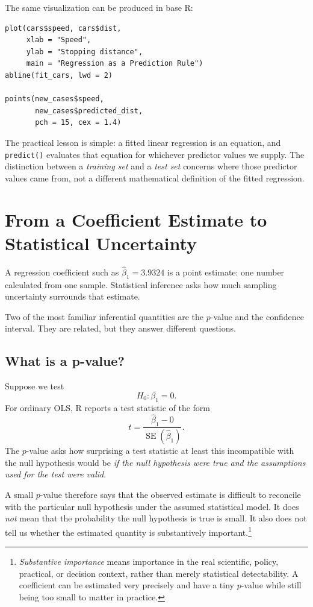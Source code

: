 \documentclass[11pt]{report}
\begin{document}
The same visualization can be produced in base R:

\begin{lstlisting}
plot(cars$speed, cars$dist,
     xlab = "Speed",
     ylab = "Stopping distance",
     main = "Regression as a Prediction Rule")
abline(fit_cars, lwd = 2)

points(new_cases$speed,
       new_cases$predicted_dist,
       pch = 15, cex = 1.4)
\end{lstlisting}

The practical lesson is simple: a fitted linear regression is an equation, and \texttt{predict()} evaluates that equation for whichever predictor values we supply. The distinction between a \emph{training set} and a \emph{test set} concerns where those predictor values came from, not a different mathematical definition of the fitted regression.

\section{From a Coefficient Estimate to Statistical Uncertainty}

A regression coefficient such as \(\widehat{\beta}_1=3.9324\) is a point estimate: one number calculated from one sample. Statistical inference asks how much sampling uncertainty surrounds that estimate.

Two of the most familiar inferential quantities are the \(p\)-value and the confidence interval. They are related, but they answer different questions.

\subsection{What is a p-value?}

Suppose we test
\[
H_0:\beta_1=0.
\]
For ordinary OLS, R reports a test statistic of the form
\[
t=
\frac{\widehat{\beta}_1-0}
{\operatorname{SE}(\widehat{\beta}_1)}.
\]
The \(p\)-value asks how surprising a test statistic at least this incompatible with the null hypothesis would be \emph{if the null hypothesis were true and the assumptions used for the test were valid}.

A small \(p\)-value therefore says that the observed estimate is difficult to reconcile with the particular null hypothesis under the assumed statistical model. It does \emph{not} mean that the probability the null hypothesis is true is small. It also does not tell us whether the estimated quantity is substantively important.\footnote{\emph{Substantive importance} means importance in the real scientific, policy, practical, or decision context, rather than merely statistical detectability. A coefficient can be estimated very precisely and have a tiny \(p\)-value while still being too small to matter in practice.}
\end{document}
